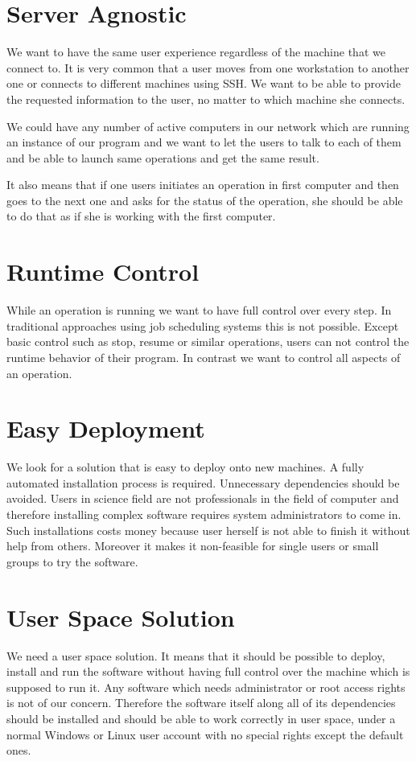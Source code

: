 \section{Server Agnostic}
We want to have the same user experience regardless of the machine that we connect to. It is very common
that a user moves from one workstation to another one or connects to different machines using SSH. We 
want to be able to provide the requested information to the user, no matter to which machine she connects.

We could have any number of active computers in our network which are running an instance of our program
and we want to let the users to talk to each of them and be able to launch same operations and get the same result.

It also means that if one users initiates an operation in first computer and then goes to the next one and asks
for the status of the operation, she should be able to do that as if she is working with the first computer.

\section{Runtime Control}
While an operation is running we want to have full control over every step. In traditional approaches using job
scheduling systems this is not possible. Except basic control such as stop, resume or similar operations, users
can not control the runtime behavior of their program. In contrast we want to control all aspects of an operation.

\section{Easy Deployment}
We look for a solution that is easy to deploy onto new machines. A fully automated installation process
is required. Unnecessary dependencies should be avoided. Users in science field are not professionals in the field
of computer and therefore installing complex software requires system administrators to come in. Such installations
costs money because user herself is not able to finish it without help from others. Moreover it makes it non-feasible
for single users or small groups to try the software.

\section{User Space Solution}
We need a user space solution. It means that it should be possible to deploy, install and run the software without
having full control over the machine which is supposed to run it. Any software which needs administrator or root access
rights is not of our concern. Therefore the software itself along all of its dependencies should be installed and should
be able to work correctly in user space, under a normal Windows or Linux user account with no special rights except the
default ones.

